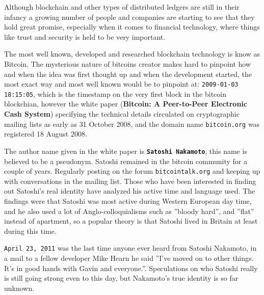 
Although blockchain and other types of distributed ledgers are still in their infancy a growing number of people and companies are starting to see that they hold great promise, especially when it comes to financial technology, where things like trust and security is held to be very important. 


The most well known, developed and researched blockchain technology is know as Bitcoin. The mysterious nature of bitcoins creator makes hard to pinpoint how and when the idea was first thought up and when the development started, the most exact way and most well known would be to pinpoint at: \texttt{2009-01-03 18:15:05}, which is the timestamp on the very first block in the bitcoin blockchian, however the white paper (\textbf{Bitcoin: A Peer-to-Peer Electronic Cash System}) specifying the technical details circulated on cryptographic mailing lists as early as 31 October 2008, and the domain name \texttt{bitcoin.org} was registered 18 August 2008. 


The author name given in the white paper is \textbf{\texttt{Satoshi Nakamoto}}, this name is believed to be a pseudonym. Satoshi remained in the bitcoin community for a couple of years. Regularly posting on the forum \texttt{bitcointalk.org} and keeping up with conversations in the mailing list. Those who have been interested in finding out Satoshi's real identity have analyzed his active time and language used. The findings were that Satoshi was most active during Western European day time, and he also used a lot of Anglo-colloquialisms such as ''bloody hard'', and ''flat'' instead of apartment, so a popular theory is that Satoshi lived in Britain at least during this time. 

\texttt{April 23, 2011} was the last time anyone ever heard from Satoshi Nakamoto, in a mail to a fellow developer Mike Hearn he said ''I've moved on to other things.  It's in good hands with Gavin and everyone.''. Speculations on who Satoshi really is still going strong even to this day, but Nakamoto's true identity is so far unknown. 
